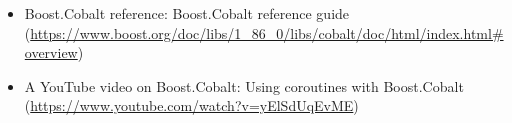 

\begin{itemize}
\item
Boost.Cobalt reference: Boost.Cobalt reference guide (\url{https://www.boost.org/doc/libs/1_86_0/libs/cobalt/doc/html/index.html#overview})

\item
A YouTube video on Boost.Cobalt: Using coroutines with Boost.Cobalt (\url{https://www.youtube.com/watch?v=yElSdUqEvME})
\end{itemize}